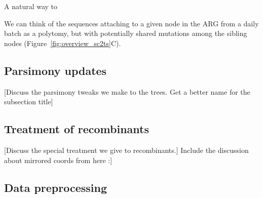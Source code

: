 \documentclass{article}
\begin{document}
A natural
way to

We can think of the sequences attaching to a given node in the ARG
from a daily batch as a polytomy,
but with potentially shared mutations among the sibling nodes
(Figure~\ref{fig:overview_sc2ts}C).



\subsection{Parsimony updates}
[Discuss the parsimony tweaks we make to the trees. Get a better name
for the subsection title]

\subsection{Treatment of recombinants}
[Discuss the special treatment we give to recombinants.]
Include the discussion about mirrored coords from here :]




\subsection{Data preprocessing}
\end{document}
